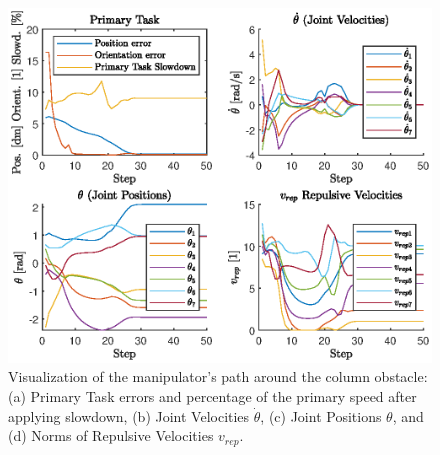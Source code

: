 \documentclass[letterpaper, 10 pt, conference]{ieeeconf}  %
\begin{document}
\begin{figure}
	\centering
	\includegraphics[width=1\linewidth]{4plots_column.eps} %
	\caption{Visualization of the manipulator's path around the column obstacle: (a) Primary Task errors and percentage of the primary speed after applying slowdown, (b) Joint Velocities $\dot{\theta}$, (c) Joint Positions $\theta$, and (d) Norms of Repulsive Velocities $v_{rep}$.}
	\label{fig:plots-3d-column}
\end{figure}

\end{document}
